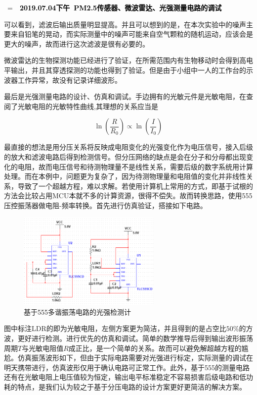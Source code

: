 \documentclass[a4paper, 11pt]{article} %
\makeatletter
\newlength\sidebar
\newlength\envborder
\def\esefcolorbox#1#{\esecolor@fbox{#1}}
\def\esecolor@fbox#1#2#3{%
   \color@b@x{\fboxsep\z@\color#1{#2}\fboxs}{\color#1{#3}}}
\newenvironment{eseframed}{%
   \def\FrameCommand{\fboxrule=\the\sidebar  \fboxsep=\the\envborder%
   \esefcolorbox{exampleborder}{examplebg}}%
   \MakeFramed{\FrameRestore}}%
  {\endMakeFramed}
\newcounter{diary}
\newenvironment{diary}[2]
 {\par\medskip\refstepcounter{diary}%
 \hbox{%
 \fboxsep=\the\sidebar\hspace{-\envborder}\hspace{-0.5\sidebar}%
 \colorbox{exampleborder}{%
 \hspace{\envborder}\footnotesize\sffamily\bfseries%
 \textcolor{black}{{#1}\ {#2}\enspace\hspace{\envborder}}
 }
 }
 \nointerlineskip\vspace{-\topsep}%
 \begin{eseframed}\noindent\ignorespaces%
 }
 {\end{eseframed}\vspace{-\baselineskip}\medskip}
\makeatother
\begin{document}
\begin{diary}{2019.07.04下午}{PM2.5传感器、微波雷达、光强测量电路的调试}
可以看到，滤波后输出质量明显提高。并且可以想到的是，在本次实验中的噪声主要来自铅笔的晃动，而实际测量中的噪声可能来自空气颗粒的随机运动，应该会是更大的噪声，故而进行这次滤波是很有必要的。

微波雷达的生物探测功能已经进行了验证，在所需范围内有生物移动时会得到高电平输出，并且其穿透探测的功能也得到了验证。但是由于小组中一人的工作台的示波器工作异常，故没有记录详细波形。

最后是光强测量电路的设计、仿真和调试。手边拥有的光敏元件是光敏电阻，在查阅了光敏电阻的光敏特性曲线,其理想的关系应当是

\begin{equation*}
  \ln(\frac{R}{R_0}) \propto \ln(\frac{I}{I_0})
\end{equation*}

最直接的想法是用分压关系将反映成电阻变化的光强变化作为电压信号，接入后级的放大和滤波电路后得到检测信号。但分压网络的缺点是会在分子和分母都出现变化的电阻，故而电压信号和待测物理量不是线性关系，需要后级的数字系统用计算处理。而在本例中，问题更为复杂了，因为待测物理量和电阻值的变化并非线性关系，导致了一个超越方程，难以求解。若使用计算机上常用的方式，即基于试根的方法会比较占用MCU本就不多的计算资源，很得不偿失。故而转换思路，使用555压控振荡器做电阻-频率转换。首先进行仿真验证，搭接如下电路。

\begin{figure}[H]
  \centering
  \includegraphics[width = 0.618\textwidth]{555_sim.jpg}
  \caption{基于555多谐振荡电路的光强检测计}
\end{figure}

图中标注LDR的即为光敏电阻，左侧方案更为简洁，并且得到的是占空比$50\%$的方波，更好进行检测。进行优先的仿真和调试。简单的数学推导后得到输出波形振荡周期$T$与光敏电阻值$R$成正比，是一个简单的关系。故而可以避免解超越方程的尴尬。仿真振荡波形如下，但由于实际电路需要对光强进行标定，实际测量的调试在明天携带进行，仿真波形仅用于确认电路可正常工作。此外，基于555的测量电路还有在光敏电阻上电压值较为恒定，输出电平标准稳定不容易损害后级电路和低功耗的特点，是我们认为较之于基于分压电路的设计方案更好更简洁的解决方案。


\end{diary}
\end{document}
